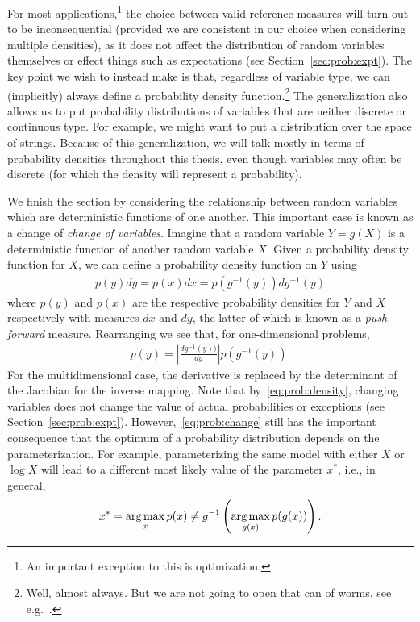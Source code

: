 For most applications,\footnote{An important
	exception to this is optimization.}
the choice between valid reference measures will turn out to be
inconsequential (provided we are consistent in our choice when considering multiple
densities), as it does not affect the distribution of random variables themselves 
or effect things such as expectations (see Section~\ref{sec:prob:expt}).  
The key point we wish to instead make is that, regardless of variable type, we can
(implicitly) always define a probability density function.\footnote{Well, almost always.  But we
	are not going to open that can of worms, see e.g.~\cite{durrett2010probability}.}  
The generalization also allows us
to put probability distributions of variables that are neither discrete or continuous type.
For example, we might want to put a distribution over the space of strings.  
Because of this generalization, we will talk mostly in terms of probability densities throughout
this thesis, even though variables may often be discrete (for which the density will 
represent a probability).

We finish the section by considering the relationship between random variables which
are deterministic functions of one another.  This important case is known as a change of
\emph{change of variables}.  Imagine
that a random variable $Y=g(X)$ is a deterministic function of another random variable $X$.
Given a probability density function for $X$, we can define a probability density function
on $Y$ using
\begin{align}
\label{eq:prob:change}
p(y)dy = p(x)dx = p(g^{-1}(y))dg^{-1}(y)
\end{align} 
where $p(y)$ and $p(x)$ are the respective probability densities for $Y$ and $X$
respectively with measures $dx$ and $dy$,  the latter of which is known as a \emph{push-forward} measure.
Rearranging we see that, for one-dimensional problems, 
\begin{align}
\label{eq:prob:change2}
p(y) = \left|\frac{dg^{-1}(y))}{dy}\right|p(g^{-1}(y)).
\end{align}
For the multidimensional case, the derivative is replaced by the determinant of the
Jacobian for the inverse mapping.  Note that by~\eqref{eq:prob:density}, changing
variables does not change the value of actual probabilities or exceptions (see
 Section~\ref{sec:prob:expt}).  However,~\eqref{eq:prob:change}
still has the important consequence that the optimum of a probability distribution
depends on the parameterization.  For example, parameterizing the same model with
either $X$ or $\log X$ will lead to a different most likely value of the parameter
$x^*$, i.e., in general,
\begin{align}
x^* = \operatorname*{arg\,max}_{x} p(x) \neq g^{-1} \left(\operatorname*{arg\,max}_{g(x)} p(g(x))\right).
\end{align}

